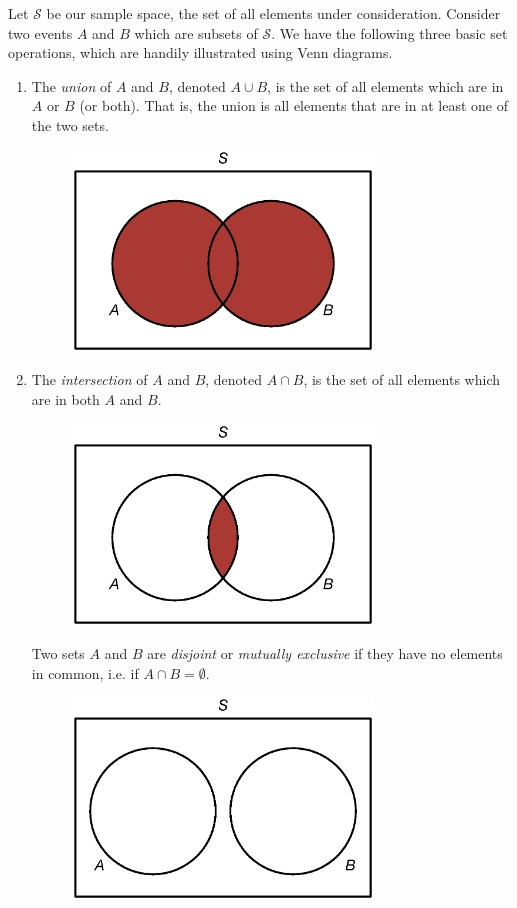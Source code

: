 \documentclass[12pt]{article}
\theoremstyle{definition}
\theoremstyle{remark}
\def\cals{{\mathcal S}}
\begin{document}
Let $\cals$ be our sample space, the set of all elements under consideration. Consider two events $A$ and $B$ which are subsets of $\cals$. We have the following three basic set operations, which are handily illustrated using Venn diagrams.
\begin{enumerate}
\item The \emph{union} of $A$ and $B$, denoted $A \cup B$, is the set of all elements which are in $A$ or $B$ (or both). That is, the union is all elements that are in at least one of the two sets.
\begin{figure}[H]
\centering
\includegraphics[width=8cm]{AunionB}
\end{figure}
\item The \emph{intersection} of $A$ and $B$, denoted $A \cap B$, is the set of all elements which are in both $A$ and $B$.
\begin{figure}[H]
\centering
\includegraphics[width=8cm]{AintersectB}
\end{figure}
Two sets $A$ and $B$ are \emph{disjoint} or \emph{mutually exclusive} if they have no elements in common, i.e. if $A \cap B = \emptyset$.
\begin{figure}[H]
\centering
\includegraphics[width=8cm]{exclusive}

\end{figure}
\end{enumerate}
\end{document}
